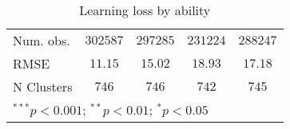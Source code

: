 \begin{table}
\begin{center}
\begin{tabular}{l c c c c}
Num. obs.                    & $302587$      & $297285$      & $231224$      & $288247$      \\
RMSE                         & $11.15$       & $15.02$       & $18.93$       & $17.18$       \\
N Clusters                   & $746$         & $746$         & $742$         & $745$         \\
\hline
\multicolumn{5}{l}{\scriptsize{$^{***}p<0.001$; $^{**}p<0.01$; $^{*}p<0.05$}}
\end{tabular}
\caption{Learning loss by ability}
\label{tableability}
\end{center}
\end{table}
